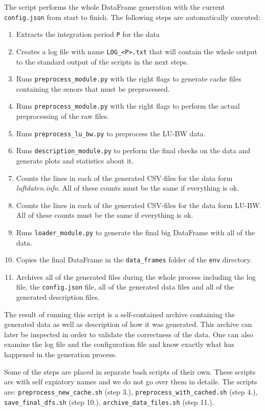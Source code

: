 \documentclass[12pt,a4paper,twoside]{scrartcl}
\numberwithin{equation}{section}
\begin{document}
The script performs the whole DataFrame generation with the current \texttt{config.json} from start to finish. The following steps are automatically executed:
\begin{enumerate}
\item Extracts the integration period \texttt{P} for the data
\item Creates a log file with name \texttt{LOG\_<P>.txt} that will contain the whole output to the standard output of the scripts in the next steps.
\item Runs \texttt{preprocess\_module.py} with the right flags to generate cache files containing the senors that must be preprocessed.
\item Runs \texttt{preprocess\_module.py} with the right flags to perform the actual preprocessing of the raw files.
\item Runs \texttt{preprocess\_lu\_bw.py} to preprocess the LU-BW data.
\item Runs \texttt{description\_module.py} to perform the final checks on the data and generate plots and statistics about it.
\item Counts the lines in each of the generated CSV-files for the data form \emph{luftdaten.info}. All of these counts must be the same if everything is ok.
\item Counts the lines in each of the generated CSV-files for the data form LU-BW. All of these counts must be the same if everything is ok.
\item Runs \texttt{loader\_module.py} to generate the final big DataFrame with all of the data.
\item Copies the final DataFrame in the \texttt{data\_frames} folder of the \texttt{env} directory.
\item Archives all of the generated files during the whole process including the log file, the \texttt{config.json} file, all of the generated data files and all of the generated description files.
\end{enumerate}
The result of running this script is a self-contained archive containing the generated data as well as description of how it was generated. This archive can later be inspected in order to validate the correctness of the data. One can also examine the log file and the configuration file and know exactly what has happened in the generation process.

Some of the steps are placed in separate bash scripts of their own. These scripts are with self expiatory names and we do not go over them in details. The scripts are: \texttt{preprocess\_new\_cache.sh} (step 3.), \texttt{preprocess\_with\_cached.sh} (step 4.), \texttt{save\_final\_dfs.sh} (step 10.), \texttt{archive\_data\_files.sh} (step 11.).
\end{document}

